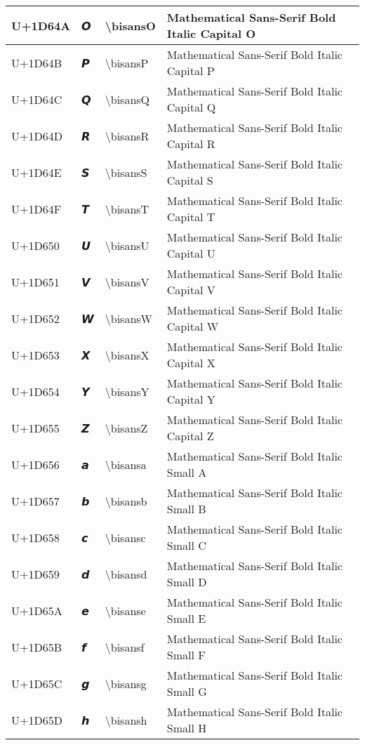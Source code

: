 \begin{table}[h]
\begin{tabulary}{\linewidth}{|L|L|L|L|}
\hline
U+1D64A & 𝙊 & {\textbackslash}bisansO & Mathematical Sans-Serif Bold Italic Capital O \\
\hline
U+1D64B & 𝙋 & {\textbackslash}bisansP & Mathematical Sans-Serif Bold Italic Capital P \\
\hline
U+1D64C & 𝙌 & {\textbackslash}bisansQ & Mathematical Sans-Serif Bold Italic Capital Q \\
\hline
U+1D64D & 𝙍 & {\textbackslash}bisansR & Mathematical Sans-Serif Bold Italic Capital R \\
\hline
U+1D64E & 𝙎 & {\textbackslash}bisansS & Mathematical Sans-Serif Bold Italic Capital S \\
\hline
U+1D64F & 𝙏 & {\textbackslash}bisansT & Mathematical Sans-Serif Bold Italic Capital T \\
\hline
U+1D650 & 𝙐 & {\textbackslash}bisansU & Mathematical Sans-Serif Bold Italic Capital U \\
\hline
U+1D651 & 𝙑 & {\textbackslash}bisansV & Mathematical Sans-Serif Bold Italic Capital V \\
\hline
U+1D652 & 𝙒 & {\textbackslash}bisansW & Mathematical Sans-Serif Bold Italic Capital W \\
\hline
U+1D653 & 𝙓 & {\textbackslash}bisansX & Mathematical Sans-Serif Bold Italic Capital X \\
\hline
U+1D654 & 𝙔 & {\textbackslash}bisansY & Mathematical Sans-Serif Bold Italic Capital Y \\
\hline
U+1D655 & 𝙕 & {\textbackslash}bisansZ & Mathematical Sans-Serif Bold Italic Capital Z \\
\hline
U+1D656 & 𝙖 & {\textbackslash}bisansa & Mathematical Sans-Serif Bold Italic Small A \\
\hline
U+1D657 & 𝙗 & {\textbackslash}bisansb & Mathematical Sans-Serif Bold Italic Small B \\
\hline
U+1D658 & 𝙘 & {\textbackslash}bisansc & Mathematical Sans-Serif Bold Italic Small C \\
\hline
U+1D659 & 𝙙 & {\textbackslash}bisansd & Mathematical Sans-Serif Bold Italic Small D \\
\hline
U+1D65A & 𝙚 & {\textbackslash}bisanse & Mathematical Sans-Serif Bold Italic Small E \\
\hline
U+1D65B & 𝙛 & {\textbackslash}bisansf & Mathematical Sans-Serif Bold Italic Small F \\
\hline
U+1D65C & 𝙜 & {\textbackslash}bisansg & Mathematical Sans-Serif Bold Italic Small G \\
\hline
U+1D65D & 𝙝 & {\textbackslash}bisansh & Mathematical Sans-Serif Bold Italic Small H \\

\end{tabulary}
\end{table}
